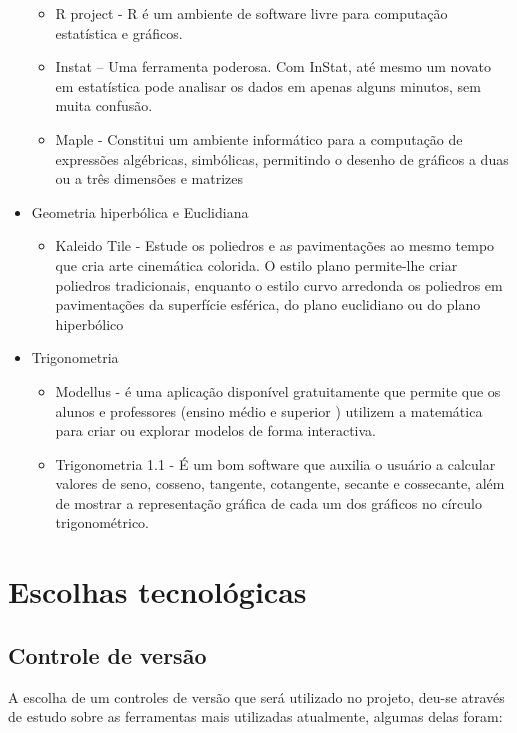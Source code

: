 \documentclass[12pt,a4paper]{article}
\begin{document}
\begin{itemize}
	\begin{itemize}
		\item  R project - R é um ambiente de software livre para computação estatística e gráficos.
		\item Instat – Uma ferramenta poderosa. Com InStat, até mesmo um novato em estatística pode analisar os dados em apenas alguns minutos, sem muita confusão.
		\item Maple - Constitui um ambiente informático para a computação de expressões algébricas, simbólicas, permitindo o desenho de gráficos a duas ou a três dimensões e matrizes
	\end{itemize}
	\item Geometria hiperbólica e Euclidiana
	
	\begin{itemize}
		\item  Kaleido Tile -  Estude os poliedros e as pavimentações ao mesmo tempo que cria arte cinemática colorida. O estilo plano permite-lhe criar poliedros tradicionais, enquanto o estilo curvo arredonda os poliedros em pavimentações da superfície esférica, do plano euclidiano ou do plano hiperbólico
	\end{itemize}
	\item Trigonometria 
	
	\begin{itemize}
		\item  Modellus - é uma aplicação disponível gratuitamente que permite que os alunos e professores (ensino médio e superior ) utilizem a matemática para criar ou explorar modelos de forma interactiva.
		\item Trigonometria 1.1 -  É um bom software que auxilia o usuário a calcular valores de seno, cosseno, tangente, cotangente, secante e cossecante, além de mostrar a representação gráfica de cada um dos gráficos no círculo trigonométrico.
	\end{itemize}
	
\end{itemize}


\section{Escolhas tecnológicas}

\subsection {Controle de versão}
A escolha de um controles de versão que será utilizado no projeto, deu-se através de estudo sobre as ferramentas mais utilizadas atualmente, algumas delas foram:
\end{document}
